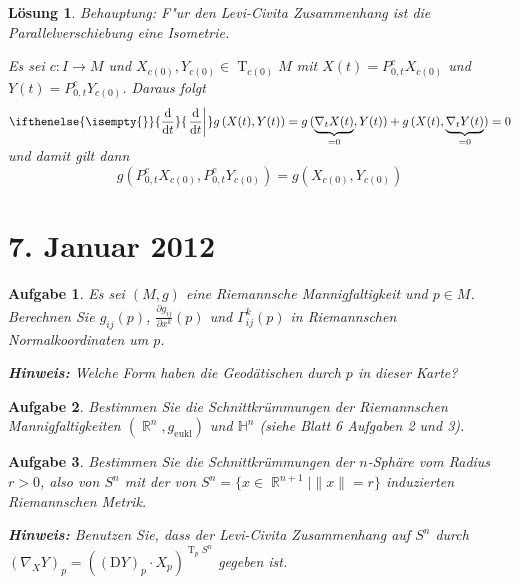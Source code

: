 \documentclass[paper=A4, twoside, chapterprefix=true, bibliography=totoc, headsepline]{scrbook}
\DeclareMathOperator{\R}{\mathbb{R}}
\DeclareMathOperator{\T}{T} %
\newcommand{\dop}{\mathrm{d}}
\newcommand{\difffrac}[3][]{\ifthenelse{\isempty{#1}}{\frac{\dop #2}{\dop #3}}{\left. \frac{\dop #2}{\dop #3} \right|_{#1}}}
\theoremstyle{plain}
\theoremstyle{nonumberplain}
\theoremstyle{empty}
\theoremstyle{break}
\newtheorem{Aufg}{Aufgabe}
\newtheorem{Loes}{L\"osung}
\begin{document}
\begin{Loes}
\emph{Behauptung:} F"ur den Levi-Civita Zusammenhang ist die Parallelverschiebung eine Isometrie.

Es sei $c: I \to M$ und $X_{c(0)}, Y_{c(0)} \in \T_{c(0)}M$ mit $X(t) = P_{0,t}^c X_{c(0)}$ und $Y(t) = P_{0,t}^c Y_{c(0)}$. Daraus folgt
	\[ \difffrac{}{t} g\left(X(t), Y(t)\right) = g\left( \smash{\underbrace{\nabla_tX(t)}_{=0}}, Y(t) \right) + g \left( X(t), \smash{\underbrace{\nabla_t Y(t)}_{=0}} \right) = 0\]
und damit gilt dann
	\[ g \left( P_{0,t}^c X_{c(0)}, P_{0,t}^c Y_{c(0)} \right) = g \left( X_{c(0)}, Y_{c(0)} \right) \]
\end{Loes}


\section{7. Januar 2012}
\setcounter{Aufg}{0} %
\setcounter{Loes}{0}

\begin{Aufg}
Es sei $(M,g)$ eine Riemannsche Mannigfaltigkeit und $p\in M$. Berechnen Sie $g_{ij}(p)$, $\frac{\partial g_{ij}}{\partial x^k}(p)$  und $\Gamma_{ij}^k(p)$ in Riemannschen Normalkoordinaten um $p$.

{\footnotesize \textbf{Hinweis:} Welche Form haben die Geodätischen durch $p$ in dieser Karte?}
\end{Aufg}

\begin{Aufg}
Bestimmen Sie die Schnittkrümmungen der Riemannschen Mannigfaltigkeiten $(\R^n,g_{\mathrm{eukl}})$ und $\mathbb{H}^n$ (siehe Blatt 6 Aufgaben 2 und 3).
\end{Aufg}

\begin{Aufg}
Bestimmen Sie die Schnittkrümmungen der $n$-Sphäre vom Radius $r>0$, also von $S^n$ mit der von $S^n=\{x \in \R^{n+1} \mid \|x\|=r\}$ induzierten Riemannschen Metrik.

{\footnotesize \textbf{Hinweis:} Benutzen Sie, dass der Levi-Civita Zusammenhang auf $S^n$  durch $(\nabla_X Y)_p=((\mathrm{D} Y)_p \cdot X_p)^{\T_p S^n}$ gegeben ist.}
\end{Aufg}
\end{document}

